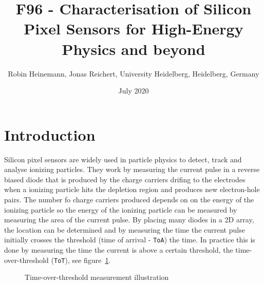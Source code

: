 \documentclass[twocolumn,DIV=14,a4paper,biblatex, 10pt]{scrartcl}
\title{F96 - Characterisation of Silicon Pixel Sensors for High-Energy Physics and beyond}
\author{Robin Heinemann, Jonas Reichert, University Heidelberg, Heidelberg, Germany}
\date{July 2020}
\newcommand{\tot}{\texttt{ToT}\xspace}
\begin{document}
\maketitle

\begin{abstract}
  \lipsum[1]
\end{abstract}

\section{Introduction}
Silicon pixel sensors are widely used in particle physics to detect, track and analyse ionizing particles. They work by measuring the current pulse in a reverse biased diode that is produced by the charge carriers drifing to the electrodes when a ionizing particle hits the depletion region and produces new electron-hole pairs. The number fo charge carriers produced depends on on the energy of the ionizing particle so the energy of the ionizing particle can be measured by measuring the area of the current pulse. By placing many diodes in a 2D array, the location can be determined and by measuring the time the current pulse initially crosses the threshold (time of arrival - \texttt{ToA}) the time.
In practice this is done by measuring the time the current is above a certain threshold, the time-over-threshold (\tot), see figure~\ref{fig:tot}.

\begin{figure}
  \begin{center}
  \end{center}
  \caption{Time-over-threshold measurement illustration\label{fig:tot}}
\end{figure}
\end{document}
